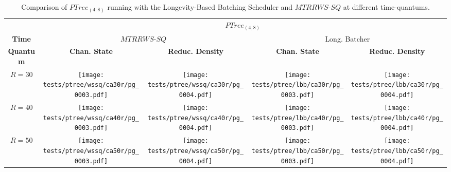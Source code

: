 \begin{table}[htp!]
    \centering
    \begin{tabular}{ccccc} & \multicolumn{4}{c}{ $PTree_{(4,8)}$ } \\ \cline{2-5}
    \multicolumn{1}{c}{\textbf{Time}} & \multicolumn{2}{c|}{ $MTRRWS$-$SQ$ } & \multicolumn{2}{c}{ Long. Batcher} \\ \cline{2-5}
    \multicolumn{1}{c|}{\textbf{Quantum}} & \textbf{Chan. State} & \multicolumn{1}{c|}{\textbf{Reduc. Density}} 
                                                & \textbf{Chan. State} & \multicolumn{1}{c|}{\textbf{Reduc. Density}} \\ \cline{1-5}
    \multicolumn{1}{c|}{$R=30$} &  \multicolumn{1}{c}{\texttt{[image: tests/ptree/wssq/ca30r/pg\_0003.pdf]}} &
                                   \multicolumn{1}{c|}{\texttt{[image: tests/ptree/wssq/ca30r/pg\_0004.pdf]}} &
                                   \multicolumn{1}{c}{\texttt{[image: tests/ptree/lbb/ca30r/pg\_0003.pdf]}} &
                                   \multicolumn{1}{c|}{\texttt{[image: tests/ptree/lbb/ca30r/pg\_0004.pdf]}} \\ \cline{1-5}

    \multicolumn{1}{c|}{$R=40$} &  \multicolumn{1}{c}{\texttt{[image: tests/ptree/wssq/ca40r/pg\_0003.pdf]}} &
                                   \multicolumn{1}{c|}{\texttt{[image: tests/ptree/wssq/ca40r/pg\_0004.pdf]}} &
                                   \multicolumn{1}{c}{\texttt{[image: tests/ptree/lbb/ca40r/pg\_0003.pdf]}} &
                                   \multicolumn{1}{c|}{\texttt{[image: tests/ptree/lbb/ca40r/pg\_0004.pdf]}} \\ \cline{1-5}

    \multicolumn{1}{c|}{$R=50$} &  \multicolumn{1}{c}{\texttt{[image: tests/ptree/wssq/ca50r/pg\_0003.pdf]}} &
                                   \multicolumn{1}{c|}{\texttt{[image: tests/ptree/wssq/ca50r/pg\_0004.pdf]}} &
                                   \multicolumn{1}{c}{\texttt{[image: tests/ptree/lbb/ca50r/pg\_0003.pdf]}} &
                                   \multicolumn{1}{c|}{\texttt{[image: tests/ptree/lbb/ca50r/pg\_0004.pdf]}} \\ \cline{1-5}
    \end{tabular}
    \caption{Comparison of $PTree_{(4,8)}$ running with the Longevity-Based 
        Batching Scheduler and $MTRRWS$-$SQ$ at different time-quantums.} 
    \label{tab:ptree-longbatcher-testing}
\end{table}

